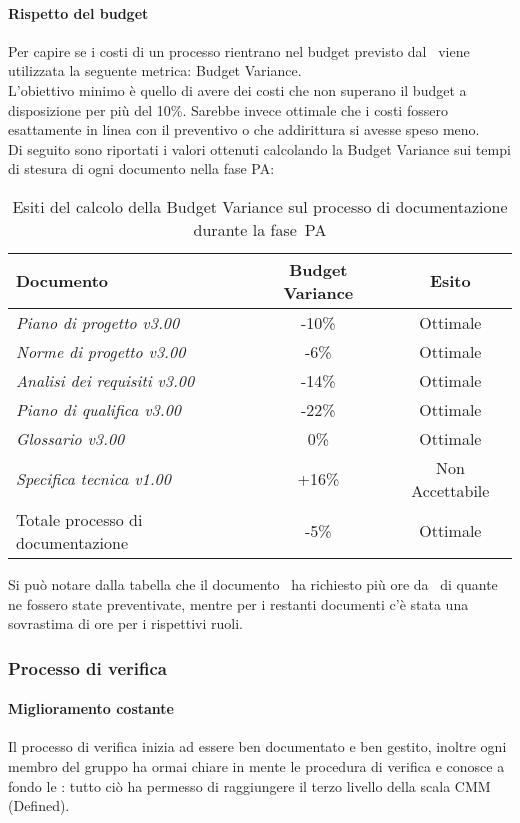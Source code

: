 \documentclass[../PianoDiQualifica.tex]{subfiles}
\begin{document}
\begin{appendices}
			\paragraph{Rispetto del budget}
			Per capire se i costi di un processo rientrano nel budget previsto dal \pianodiprogetto\ viene utilizzata la seguente metrica: Budget Variance.\\
			L'obiettivo minimo è quello di avere dei costi che non superano il budget a disposizione per più del 10\%. Sarebbe invece ottimale che i costi fossero esattamente in linea con il preventivo o che addirittura si avesse speso meno.\\
			Di seguito sono riportati i valori ottenuti calcolando la Budget Variance sui tempi di stesura di ogni documento nella fase PA:
			\begin{table}[H]
				\centering
				\begin{tabular}{l * {2}{c}}
					\toprule
					\textbf{Documento} & \textbf{Budget Variance} & \textbf{Esito} \\
					\midrule
					\textit{Piano di progetto v3.00} & -10\% &  Ottimale \\
					\textit{Norme di progetto v3.00} & -6\% & Ottimale \\
					\textit{Analisi dei requisiti v3.00} & -14\% & Ottimale \\
					\textit{Piano di qualifica v3.00} & -22\% & Ottimale \\
					\textit{Glossario v3.00} & 0\% & Ottimale \\
					\textit{Specifica tecnica v1.00} & +16\% & Non Accettabile \\
					Totale processo di documentazione & -5\% & Ottimale \\
					\bottomrule
				\end{tabular}
				\caption{Esiti del calcolo della Budget Variance sul processo di documentazione durante la fase\g\ PA}
				\label{tab:esiti_budget_variance}
			\end{table}
			 Si può notare dalla tabella che il documento \specificatecnica\ ha richiesto più ore da \progettista\ di quante ne fossero state preventivate, mentre per i restanti documenti c'è stata una sovrastima di ore per i rispettivi ruoli.
						
		\subsubsection{Processo di verifica}
			\paragraph{Miglioramento costante}
			Il processo di verifica inizia ad essere ben documentato e ben gestito, inoltre ogni membro del gruppo ha ormai chiare in mente le procedura di verifica e conosce a fondo le \normediprogetto: tutto ciò ha permesso di raggiungere il terzo livello della scala CMM (Defined).
			

\end{appendices}
\end{document}
